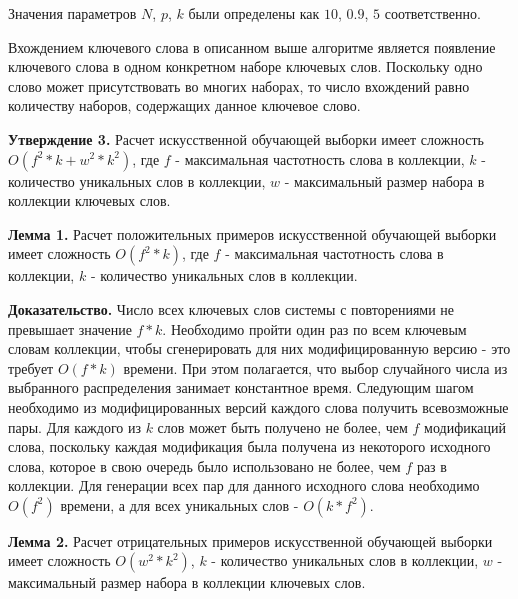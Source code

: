 Значения параметров $N$, $p$, $k$ были определены как $10$, $0.9$, $5$ соответственно.

Вхождением ключевого слова в описанном выше алгоритме является появление ключевого слова в одном конкретном наборе ключевых слов. Поскольку одно слово может присутствовать во многих наборах, то число вхождений равно количеству наборов, содержащих данное ключевое слово.


\textbf{Утверждение 3.} Расчет искусственной обучающей выборки имеет сложность $O(f^2 * k + w^2 * k^2)$, где $f$ - максимальная частотность слова в коллекции, $k$ - количество уникальных слов в коллекции, $w$ - максимальный размер набора в коллекции ключевых слов.

%

\textbf{Лемма 1.} Расчет положительных примеров искусственной обучающей выборки имеет сложность $O(f^2 * k)$, где $f$ - максимальная частотность слова в коллекции, $k$ - количество уникальных слов в коллекции.

\textbf{Доказательство.} 
Число всех ключевых слов системы с повторениями не превышает значение $f * k$. Необходимо пройти один раз по всем ключевым словам коллекции, чтобы сгенерировать для них модифицированную версию - это требует $O(f * k)$ времени. При этом полагается, что выбор случайного числа из выбранного распределения занимает константное время. Следующим шагом необходимо из модифицированных версий каждого слова получить всевозможные пары. Для каждого из $k$ слов может быть получено не более, чем $f$ модификаций слова, поскольку каждая модификация была получена из некоторого исходного слова, которое в свою очередь было использовано не более, чем $f$ раз в коллекции. Для генерации всех пар для данного исходного слова необходимо $O(f^2)$ времени, а для всех уникальных слов - $O(k * f^2)$.

\textbf{Лемма 2.} Расчет отрицательных примеров искусственной обучающей выборки имеет сложность $O(w^2 * k^2)$, $k$ - количество уникальных слов в коллекции, $w$ - максимальный размер набора в коллекции ключевых слов.

